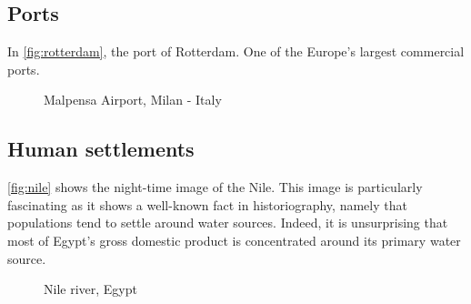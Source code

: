 \subsection{Ports}
 In \autoref{fig:rotterdam}, the port of Rotterdam. One of the Europe's largest commercial ports. 
\begin{figure}[h!]
    \centering
    \qquad
    \caption{Malpensa Airport, Milan - Italy}%
    \label{fig:rotterdam}
\end{figure}
\subsection{Human settlements}
 \autoref{fig:nile} shows the night-time image of the Nile. This image is particularly fascinating as it shows a well-known fact in historiography, namely that populations tend to settle around water sources. Indeed, it is unsurprising that most of Egypt's gross domestic product is concentrated around its primary water source.
\begin{figure}[h!]
    \centering
    \qquad
    \caption{Nile river, Egypt}%
    \label{fig:nile}
\end{figure}

